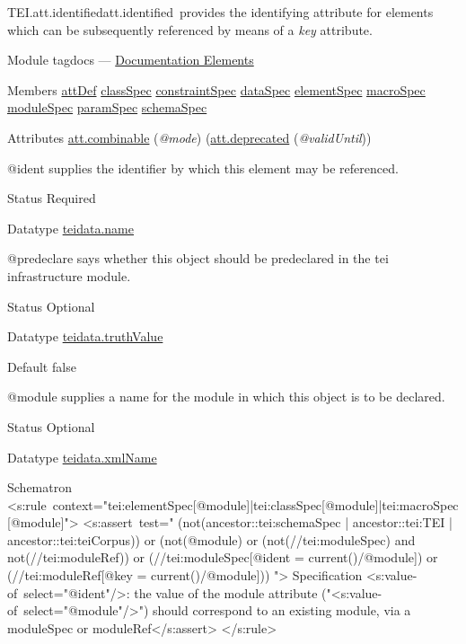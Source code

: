 \begin{reflist}
\item[]\begin{specHead}{TEI.att.identified}{att.identified} provides the identifying attribute for elements which can be subsequently referenced by means of a {\itshape key} attribute.\end{specHead} 
    \item[{Module}]
  tagdocs — \hyperref[TD]{Documentation Elements}
    \item[{Members}]
  \hyperref[TEI.attDef]{attDef} \hyperref[TEI.classSpec]{classSpec} \hyperref[TEI.constraintSpec]{constraintSpec} \hyperref[TEI.dataSpec]{dataSpec} \hyperref[TEI.elementSpec]{elementSpec} \hyperref[TEI.macroSpec]{macroSpec} \hyperref[TEI.moduleSpec]{moduleSpec} \hyperref[TEI.paramSpec]{paramSpec} \hyperref[TEI.schemaSpec]{schemaSpec}
    \item[{Attributes}]
  \hyperref[TEI.att.combinable]{att.combinable} (\textit{@mode})  (\hyperref[TEI.att.deprecated]{att.deprecated} (\textit{@validUntil})) \hfil\\[-10pt]\begin{sansreflist}
    \item[@ident]
  supplies the identifier by which this element may be referenced.
\begin{reflist}
    \item[{Status}]
  Required
    \item[{Datatype}]
  \hyperref[TEI.teidata.name]{teidata.name}
\end{reflist}  
    \item[@predeclare]
  says whether this object should be predeclared in the \textsf{tei} infrastructure module.
\begin{reflist}
    \item[{Status}]
  Optional
    \item[{Datatype}]
  \hyperref[TEI.teidata.truthValue]{teidata.truthValue}
    \item[{Default}]
  false
\end{reflist}  
    \item[@module]
  supplies a name for the module in which this object is to be declared.
\begin{reflist}
    \item[{Status}]
  Optional
    \item[{Datatype}]
  \hyperref[TEI.teidata.xmlName]{teidata.xmlName}
\end{reflist}  
\end{sansreflist}  
    \item[{Schematron}]
   <s:rule context="tei:elementSpec[@module]|tei:classSpec[@module]|tei:macroSpec[@module]"> <s:assert test=" (not(ancestor::tei:schemaSpec | ancestor::tei:TEI | ancestor::tei:teiCorpus))   or (not(@module) or (not(//tei:moduleSpec) and not(//tei:moduleRef))   or (//tei:moduleSpec[@ident = current()/@module]) or (//tei:moduleRef[@key   = current()/@module])) "> Specification <s:value-of select="@ident"/>: the value of the module attribute ("<s:value-of select="@module"/>")  should correspond to an existing module, via a moduleSpec or  moduleRef</s:assert> </s:rule>
\end{reflist}  

